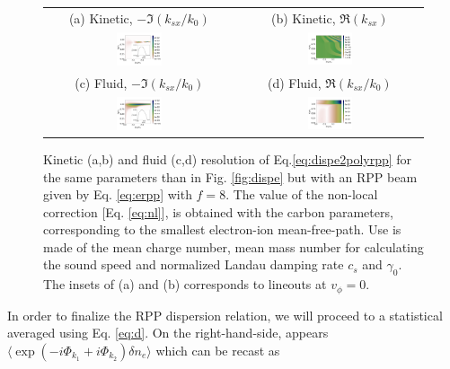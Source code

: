 \documentclass[
 reprint,
 amsmath,amssymb,
 aps,
]{revtex4-1}
\begin{document}
\begin{figure}
\begin{tabular}{cc}
(a) Kinetic, $-\Im(k_{sx}/k_0)$ &
(b)  Kinetic, $\Re(k_{sx})$ \\
\includegraphics[width=0.25\textwidth]{Grpp_CH_new.png}&
\includegraphics[width=0.25\textwidth]{krpp_CH.png}\\
(c) Fluid, $-\Im(k_{sx}/k_0)$  &
(d) Fluid, $\Re(k_{sx}/k_0)$  \\
\includegraphics[width=0.25\textwidth]{Gfrpp_CH_new.png}&
\includegraphics[width=0.25\textwidth]{kfrpp_CH.png}
\end{tabular}
\caption{ \label{fig:dispeCHrpp}  
Kinetic (a,b) and fluid (c,d) resolution of Eq.\eqref{eq:dispe2polyrpp} for  the same parameters than in Fig. \ref{fig:dispe} but with an RPP beam given by Eq. \eqref{eq:erpp} with $f=8$.  The value of the non-local correction [Eq. \eqref{eq:nl}], is obtained with the carbon parameters, corresponding to the smallest electron-ion mean-free-path. Use is made of the mean charge number, mean mass number   for calculating the sound speed and normalized Landau damping rate $c_s$ and $\gamma_0$.
The insets  of (a) and (b) corresponds to lineouts at $v_\phi=0$. 
 }
\end{figure}
In order to finalize the RPP dispersion relation, we will proceed to a statistical averaged using Eq. \eqref{eq:d}. On the right-hand-side, appears $\langle\exp(-i\Phi_{k_1}+i\Phi_{k_2})\delta n_e \rangle$ which can be recast as
\end{document}
